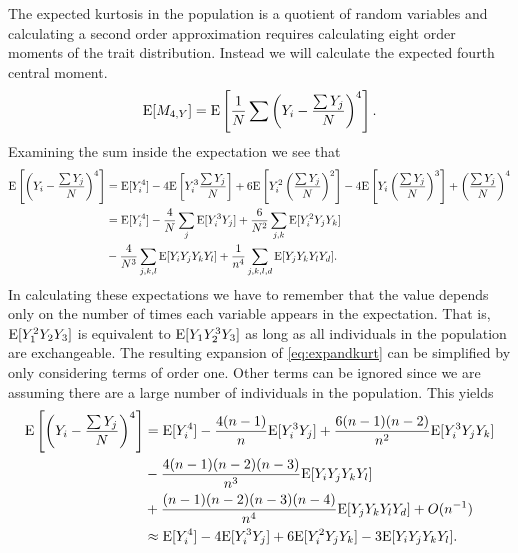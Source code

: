 The expected kurtosis in the population is a quotient of random variables and
calculating a second order approximation requires calculating eight order
moments of the trait distribution. Instead we will calculate the expected fourth
central moment.
\begin{equation}
  \mathrm{E}[M_{4,Y}] = \mathrm{E}\left[\frac{1}{N} \sum \left( Y_i - \frac{\sum Y_j}{N} \right)^4 \right].
\end{equation}
Examining the sum inside the expectation we see that 
\begin{align}
  \label{eq:expandkurt}
  \mathrm{E}\left[ \left( Y_i - \frac{\sum Y_j}{N} \right)^4 \right] &= \mathrm{E}[Y_i^4] - 
                                                              4\mathrm{E}\left[ Y_i^3 \frac{\sum Y_j}{N} \right] + 
                                                              6\mathrm{E}\left[Y_i^2\left(\frac{\sum Y_j}{N}\right)^2\right] - 
                                                              4\mathrm{E}\left[Y_i\left(\frac{\sum Y_j}{N}\right)^3\right]+ 
                                                              \left(\frac{\sum Y_j}{N}\right)^4 \nonumber \\
                                                            &= \mathrm{E}[Y_i^4] - 
                                                              \frac{4}{N}\sum_j \mathrm{E}[Y_i^3Y_j] + 
                                                              \frac{6}{N^2}\sum_{j,k} \mathrm{E}[Y_i^2Y_jY_k] \nonumber\\
                                                              &-\frac{4}{N^3}\sum_{j,k,l}\mathrm{E}[Y_iY_jY_kY_l] + 
                                                              \frac{1}{n^4}\sum_{j,k,l,d}\mathrm{E}[Y_jY_kY_lY_d].
\end{align}
In calculating these expectations we have to remember that the value depends
only on the number of times each variable appears in the expectation. That is,
$\mathrm{E}[Y_1^2Y_2Y_3]$ is equivalent to $\mathrm{E}[Y_1Y_2^3Y_3]$ as long as all individuals
in the population are exchangeable. The resulting expansion of
\eqref{eq:expandkurt} can be simplified by only considering terms of order one.
Other terms can be ignored since we are assuming there are a large number of
individuals in the population. This yields
\begin{align}
  \label{eq:popkurt}
  \mathrm{E}\left[ \left( Y_i - \frac{\sum Y_j}{N} \right)^4 \right] &=
  \mathrm{E}[Y_i^4]  - \frac{4(n-1)}{n}\mathrm{E}[Y_i^3Y_j] + \frac{6(n-1)(n-2)}{n^2}\mathrm{E}[Y_i^3Y_jY_k]  \nonumber \\
  &- \frac{4(n-1)(n-2)(n-3)}{n^3}\mathrm{E}[Y_iY_jY_kY_l] \nonumber \\
  &+ \frac{(n-1)(n-2)(n-3)(n-4)}{n^4}\mathrm{E}[Y_jY_kY_lY_d]
  + O(n^{-1}) \nonumber \\
  &\approx \mathrm{E}[Y_i^4]  - 4\mathrm{E}[Y_i^3Y_j] + 6\mathrm{E}[Y_i^2Y_jY_k] - 3\mathrm{E}[Y_iY_jY_kY_l].
\end{align}

